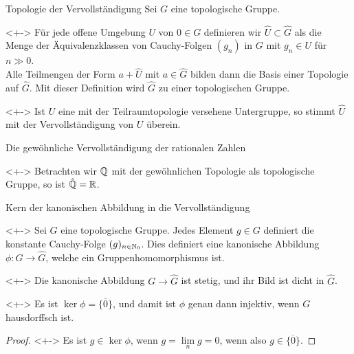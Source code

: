 \begin{frame}{Topologie der Vervollständigung}
	Sei \(G\) eine topologische Gruppe.
	\begin{remark}<+->
		Für jede offene Umgebung \(U\) von
		\(0 \in G\) definieren wir \(\hat U \subset \hat G\) als die Menge der
		Äquivalenzklassen von Cauchy-Folgen \((g_n)\) in \(G\) mit \(g_n \in U\)
		für \(n \gg 0\).
		\\
		Alle Teilmengen der Form \(a + \hat U\) mit \(a \in \hat G\) bilden dann
		die Basis einer Topologie auf \(\hat G\). Mit dieser Definition wird
		\(\hat G\) zu einer topologischen Gruppe.
	\end{remark}
	\begin{visibleenv}<+->
		Ist \(U\) eine mit der Teilraumtopologie versehene Untergruppe, so stimmt \(\hat U\)
		mit der Vervollständigung von \(U\) überein.
	\end{visibleenv}
\end{frame}

\begin{frame}{Die gewöhnliche Vervollständigung der rationalen Zahlen}
	\begin{example}<+->
		Betrachten wir \(\mathbb Q\) mit der gewöhnlichen Topologie als topologische Gruppe,
		so ist \(\hat{\mathbb Q} = \mathbb R\).
	\end{example}
\end{frame}

\begin{frame}{Kern der kanonischen Abbildung in die Vervollständigung}
	\begin{visibleenv}<+->
		Sei \(G\) eine topologische Gruppe. Jedes Element \(g \in G\) definiert die konstante
		Cauchy-Folge \((g)_{n \in \mathbb N_0}\). Dies definiert eine kanonische 
		Abbildung \(\phi\colon G \to \hat G\), welche ein Gruppenhomomorphismus ist.
	\end{visibleenv}
	\begin{example}<+->
		Die kanonische Abbildung \(G \to \hat G\) ist stetig, und ihr Bild ist dicht
		in \(\hat G\).
	\end{example}
	\begin{proposition}<+->
		Es ist \(\ker \phi = \overline{\{0\}}\), und damit ist \(\phi\) genau dann injektiv, wenn
		\(G\) hausdorffsch ist.
	\end{proposition}
	\begin{proof}<+->
		Es ist \(g \in \ker \phi\), wenn \(g = \lim\limits_n g = 0\), wenn also \(g \in \overline{\{0\}}\).
	\end{proof}
\end{frame}

